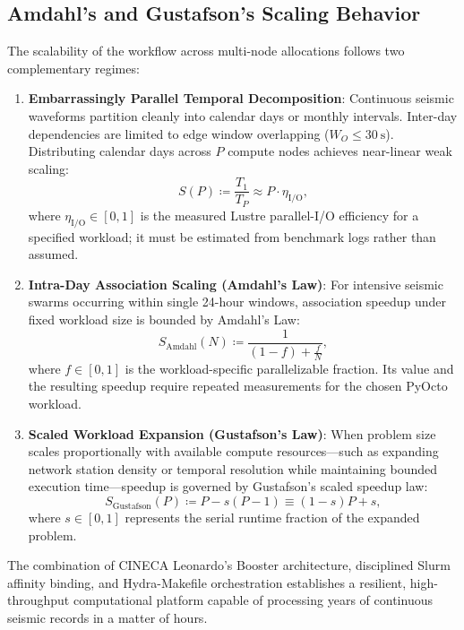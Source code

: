 \subsection{Amdahl's and Gustafson's Scaling Behavior}
The scalability of the workflow across multi-node allocations
follows two complementary regimes:
\begin{enumerate}
  \item \textbf{Embarrassingly Parallel Temporal Decomposition}:
    Continuous seismic waveforms partition cleanly into calendar
    days or monthly intervals. Inter-day dependencies are limited to
    edge window overlapping ($W_O \le \qty{30}{\second}$). Distributing
    calendar days across $P$ compute nodes achieves near-linear weak scaling:
    \begin{equation}
      S(P) \coloneqq \frac{T_1}{T_P} \approx P \cdot \eta_{\mathrm{I/O}},
    \end{equation}
    where $\eta_{\mathrm{I/O}} \in [0,1]$ is the measured Lustre
    parallel-I/O efficiency for a specified workload; it must be
    estimated from benchmark logs rather than assumed.
  \item \textbf{Intra-Day Association Scaling (Amdahl's Law)}: For intensive
    seismic swarms occurring within single 24-hour windows,
    association speedup under fixed workload size is bounded by Amdahl's Law:
    \begin{equation}
      S_{\mathrm{Amdahl}}(N) \coloneqq \frac{1}{(1 - f) + \frac{f}{N}},
    \end{equation}
    where $f \in [0,1]$ is the workload-specific parallelizable
    fraction. Its value and the resulting speedup require repeated
    measurements for the chosen \ac{PyOcto} workload.
  \item \textbf{Scaled Workload Expansion (Gustafson's Law)}: When problem
    size scales proportionally with available compute resources---such as
    expanding network station density or temporal resolution while maintaining
    bounded execution time---speedup is governed by Gustafson's
    scaled speedup law:
    \begin{equation}
      S_{\mathrm{Gustafson}}(P) \coloneqq P - s(P - 1) \equiv (1 - s)P + s,
    \end{equation}
    where $s \in [0, 1]$ represents the serial runtime fraction of
    the expanded problem.
\end{enumerate}

The combination of \ac{CINECA} Leonardo's Booster architecture,
disciplined Slurm affinity binding, and Hydra-Makefile orchestration
establishes a resilient, high-throughput computational platform
capable of processing years of continuous seismic records in a matter of hours.
